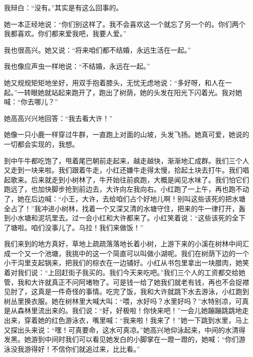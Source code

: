 我辩白：“没有。”其实是有这么回事的。 

她一本正经地说：“你们别这样了。我不会喜欢这一个就忘了另一个的。你们两个我都喜欢。你们都来爱我吧，我要人爱。” 

我也很高兴。她又说：“将来咱们都不结婚，永远生活在一起。” 

我也像应声虫一样地说：“不结婚，永远在一起。” 

她又规规矩矩地坐好，用双手抱着膝头，无忧无虑地说：“多好呀，和人在一起。”一转眼她就站起来跑开了，跑出了树荫，她的头发在阳光下闪着光。我对她喊：“你去哪儿？” 

她高高兴兴地回答：“我去看大许！” 

她像一只小鹿一样穿过牛群，一直跑上对面的山坡，头发飞扬。她真可爱，她说的一切都会实现的，我想。 

到中午牛都吃饱了，甩着尾巴朝前走起来，越走越快，渐渐地汇成群。我们三个人又走到一块来啦。我们跟着牛走，小红还嫌牛走得太慢，拾起土块去打牛。我们唱起歌来。后来就走到小树林了，牛开始往前疯跑，大概是闻见水味了。我们怕它们跑远了，也加快脚步抢到前边去，大许向左我向右。小红跑了一上午，再也跑不动了，她在后边喊：“小王，大许，去给咱们占个好地儿啊！别叫这些该死的把水塘全占了！”我冲进小树林，找着一个又深又清的水塘守住，把来的牛一律打开，轰到小水塘和泥坑里去。过一会小红和大许都来了。小红笑着说：“这些该死的全下了塘啦。咱们没事儿了。乌拉！我们来做饭！” 

我们来到的地方真好，草地上疏疏落落地长着小树，上游下来的小溪在树林中间汇成一个又一个池塘，我挑中的这一个简直可以叫做小湖呢。我们在树荫下边的一个小干沟里支起锅来，把我们的棕衣在一边铺好。小红从书包里拿出一块腊肉，她笑着对我们说：“上回赶街子我买的。我们今天来吃吧。”我们三个人的工资都交给她管，我和大许就真正不问阿堵物了。可是钱一给了她我们就老有钱，再也不会捉襟见肘了，这真是一件奇怪的事情。吃完了饭，我和大许就跳下水去游泳，小红跑到树丛里换衣服。她在树林里大喊大叫：“喂，水好吗？水里好吗？”水特别凉，可真是从森林里流出来的。我们说：“好，好极啦！你快来吧！”一会儿她蹦蹦跳跳地走出来，穿着她的红色游泳衣，嘴里喊：“我来啦！我来了！”她一下跳到水里，马上又探出头来说：“嘿！可真要命，这水可真凉。”她高兴地仰泳起来，中间的水清得发黑。她游到中间时我们可以看见她发白的小脚掌在一蹬一蹬的，她喊：“你们游泳没我游得好！不信你们就追过来，比比看。” 

